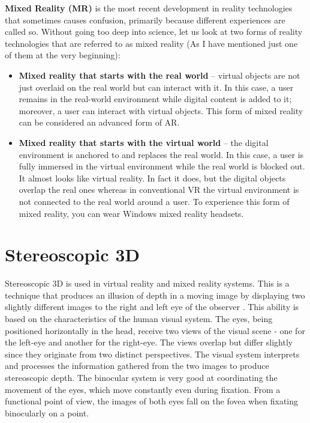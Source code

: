 \par \textbf{Mixed Reality (MR)} is the most recent development in reality technologies that sometimes causes confusion, primarily because different experiences are called so. Without going too deep into science, let us look at two forms of reality technologies that are referred to as mixed reality (As I have mentioned just one of them at the very beginning):

\begin{itemize}

\item \textbf{ Mixed reality that starts with the real world }– virtual objects are not just overlaid on the real world but can interact with it. In this case, a user remains in the real-world environment while digital content is added to it; moreover, a user can interact with virtual objects. This form of mixed reality can be considered an advanced form of AR.

\item  \textbf{Mixed reality that starts with the virtual world} – the digital environment is anchored to and replaces the real world. In this case, a user is fully immersed in the virtual environment while the real world is blocked out. It almost looks like virtual reality. In fact it does, but the digital objects overlap the real ones whereas in conventional VR the virtual environment is not connected to the real world around a user. To experience this form of mixed reality, you can wear Windows mixed reality headsets. 
\end{itemize}

\section{Stereoscopic 3D}

Stereoscopic 3D is used in virtual reality and  mixed reality systems.
This  is a technique that produces an illusion of depth in a moving image by displaying two slightly different images to the right and left eye of the observer . This ability is based on the characteristics of the human visual system. The eyes, being positioned horizontally in the head, receive two views of the visual scene - one for the left-eye and another for the right-eye. The views overlap but differ slightly since they originate from two distinct perspectives. The visual system interprets and processes the information gathered from the two images to produce stereoscopic depth. The binocular system is very good at coordinating the movement of the eyes, which move constantly even during fixation. From a functional point of view, the images of both eyes fall on the fovea when fixating binocularly on a point. 


